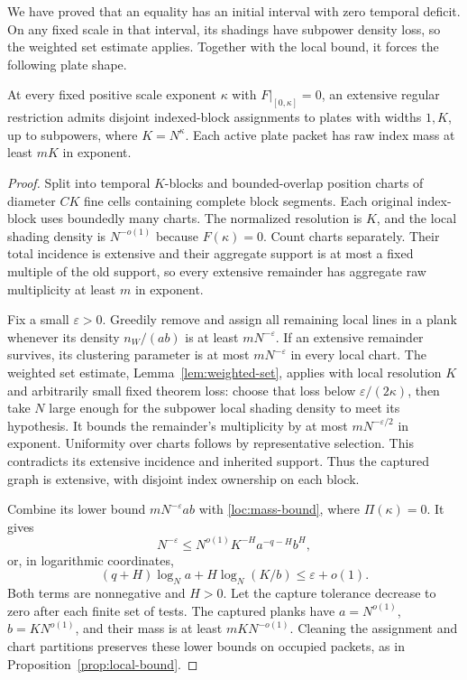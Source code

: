 We have proved that an equality has an initial interval with zero
temporal deficit.  On any fixed scale in that interval, its shadings
have subpower density loss, so the weighted set estimate applies.
Together with the local bound, it forces the following plate shape.

\begin{lemma}
\label{loc:flat-saturation}
At every fixed positive scale exponent $\kappa$ with
$F|_{[0,\kappa]}=0$, an extensive regular restriction admits
disjoint indexed-block assignments to plates with widths
$1,K$, up to subpowers, where $K=N^\kappa$.  Each active plate
packet has raw index mass at least $mK$ in exponent.
\end{lemma}

\begin{proof}
Split into temporal $K$-blocks and bounded-overlap position charts
of diameter $CK$ fine cells containing complete block segments.
Each original index-block uses boundedly many charts.  The normalized
resolution is $K$, and the local shading density is $N^{-o(1)}$
because $F(\kappa)=0$.  Count charts separately.  Their total
incidence is extensive and their aggregate support is at most a
fixed multiple of the old support, so every extensive remainder
has aggregate raw multiplicity at least $m$ in exponent.

Fix a small $\varepsilon>0$.  Greedily remove and assign all
remaining local lines in a plank whenever its density
$n_W/(ab)$ is at least $mN^{-\varepsilon}$.  If an extensive
remainder survives, its clustering parameter is at most
$mN^{-\varepsilon}$ in every local chart.  The weighted set
estimate, Lemma~\ref{lem:weighted-set}, applies with local
resolution $K$ and arbitrarily small fixed theorem loss: choose
that loss below $\varepsilon/(2\kappa)$, then take $N$ large enough
for the subpower local shading density to meet its hypothesis.
It bounds the remainder's multiplicity by at most
$mN^{-\varepsilon/2}$ in exponent.  Uniformity over charts follows
by representative selection.  This contradicts its extensive
incidence and inherited support.  Thus the captured graph is
extensive, with disjoint index ownership on each block.

Combine its lower bound $mN^{-\varepsilon}ab$ with
\eqref{loc:mass-bound}, where $\Pi(\kappa)=0$.  It gives
\[
 N^{-\varepsilon}\leq
 N^{o(1)}K^{-H}a^{-q-H}b^H,
\]
or, in logarithmic coordinates,
\[
 (q+H)\log_N a+H\log_N(K/b)
       \leq\varepsilon+o(1).
\]
Both terms are nonnegative and $H>0$.  Let the capture tolerance
decrease to zero after each finite set of tests.  The captured
planks have $a=N^{o(1)}$, $b=KN^{o(1)}$, and their mass is at
least $mK N^{-o(1)}$.  Cleaning the assignment and chart partitions
preserves these lower bounds on occupied packets, as in
Proposition~\ref{prop:local-bound}.
\end{proof}


